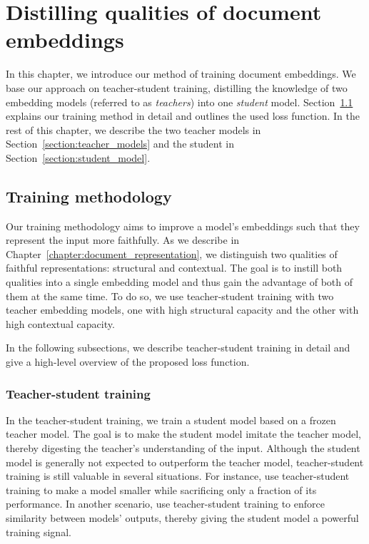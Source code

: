 \chapter{Distilling qualities of document embeddings}\label{chapter:training_method}

In this chapter, we introduce our method of training document embeddings. We
base our approach on teacher-student training, distilling the knowledge of two
embedding models (referred to as \emph{teachers}) into one \emph{student}
model. Section~\ref{section:training_method} explains our training method in
detail and outlines the used loss function. In the rest of this chapter, we
describe the two teacher models in Section~\ref{section:teacher_models} and the
student in Section~\ref{section:student_model}.

\section{Training methodology}\label{section:training_method}

Our training methodology aims to improve a model's embeddings such that they
represent the input more faithfully. As we describe in
Chapter~\ref{chapter:document_representation}, we distinguish two qualities of
faithful representations: structural and contextual. The goal is to instill
both qualities into a single embedding model and thus gain the advantage of
both of them at the same time. To do so, we use teacher-student training with
two teacher embedding models, one with high structural capacity and the other
with high contextual capacity.

In the following subsections, we describe teacher-student training in detail
and give a high-level overview of the proposed loss function.

\subsection{Teacher-student training}

In the teacher-student training, we train a student model based on a frozen
teacher model. The goal is to make the student model imitate the teacher model,
thereby digesting the teacher's understanding of the input. Although the
student model is generally not expected to outperform the teacher model,
teacher-student training is still valuable in several situations. For instance,
\cite{sanh2019distilbert} use teacher-student training to make a model smaller
while sacrificing only a fraction of its performance. In another scenario,
\cite{reimers2020making} use teacher-student training to enforce similarity
between models' outputs, thereby giving the student model a powerful training
signal.

